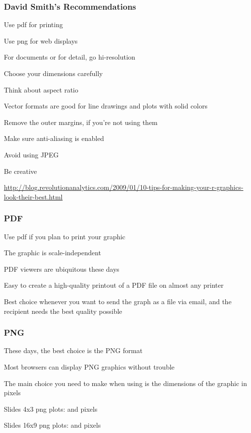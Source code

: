 \documentclass[12pt]{beamer}\usepackage[]{graphicx}\usepackage[]{color}
\begin{document}

\begin{frame}
\frametitle{David Smith's Recommendations}

\bi
  \item Use pdf for printing
  \item Use png for web displays
  \item For documents or for detail, go hi-resolution
  \item Choose your dimensions carefully
  \item Think about aspect ratio
  \item Vector formats are good for line drawings and plots with solid colors
  \item Remove the outer margins, if you're not using them
  \item Make sure anti-aliasing is enabled
  \item Avoid using JPEG
  \item Be creative
\ei

{\scriptsize \url{http://blog.revolutionanalytics.com/2009/01/10-tips-for-making-your-r-graphics-look-their-best.html}}

\end{frame}


\begin{frame}
\frametitle{PDF}

\bi
  \item Use pdf if you plan to print your graphic
  \item The graphic is scale-independent
  \item PDF viewers are ubiquitous these days
  \item Easy to create a high-quality printout of a PDF file on almost any printer
  \item Best choice whenever you want to send the graph as a file via email, and the recipient needs the best quality possible
\ei
\eb

\end{frame}


\begin{frame}
\frametitle{PNG}

\bi
  \item These days, the best choice is the PNG format
  \item Most browsers can display PNG graphics without trouble
  \item The main choice you need to make when using  is the dimensions of the graphic in pixels
  \item Slides 4x3 png plots:  and  pixels
  \item Slides 16x9 png plots:  and  pixels
\ei
\eb

\end{frame}
\end{document}
